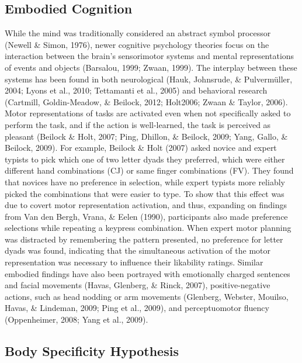 \documentclass[english,man]{apa6}
\theoremstyle{definition}
\theoremstyle{definition}
\theoremstyle{definition}
\theoremstyle{remark}
\begin{document}
\subsection{Embodied Cognition}\label{embodied-cognition}

While the mind was traditionally considered an abstract symbol processor
(Newell \& Simon, 1976), newer cognitive psychology theories focus on
the interaction between the brain's sensorimotor systems and mental
representations of events and objects (Barsalou, 1999; Zwaan, 1999). The
interplay between these systems has been found in both neurological
(Hauk, Johnsrude, \& Pulvermüller, 2004; Lyons et al., 2010; Tettamanti
et al., 2005) and behavioral research (Cartmill, Goldin-Meadow, \&
Beilock, 2012; Holt2006; Zwaan \& Taylor, 2006). Motor representations
of tasks are activated even when not specifically asked to perform the
task, and if the action is well-learned, the task is perceived as
pleasant (Beilock \& Holt, 2007; Ping, Dhillon, \& Beilock, 2009; Yang,
Gallo, \& Beilock, 2009). For example, Beilock \& Holt (2007) asked
novice and expert typists to pick which one of two letter dyads they
preferred, which were either different hand combinations (CJ) or same
finger combinations (FV). They found that novices have no preference in
selection, while expert typists more reliably picked the combinations
that were easier to type. To show that this effect was due to covert
motor representation activation, and thus, expanding on findings from
Van den Bergh, Vrana, \& Eelen (1990), participants also made preference
selections while repeating a keypress combination. When expert motor
planning was distracted by remembering the pattern presented, no
preference for letter dyads was found, indicating that the simultaneous
activation of the motor representation was necessary to influence their
likability ratings. Similar embodied findings have also been portrayed
with emotionally charged sentences and facial movements (Havas,
Glenberg, \& Rinck, 2007), positive-negative actions, such as head
nodding or arm movements (Glenberg, Webster, Mouilso, Havas, \&
Lindeman, 2009; Ping et al., 2009), and perceptuomotor fluency
(Oppenheimer, 2008; Yang et al., 2009).

\subsection{Body Specificity
Hypothesis}\label{body-specificity-hypothesis}
\end{document}

